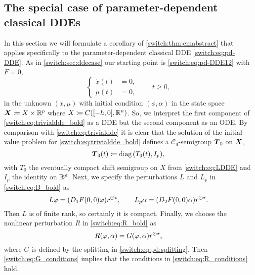\subsection{The special case of parameter-dependent classical DDEs}\label{switch:sec:pd:ddes}
In this section we will formulate a corollary of \cref{switch:thm:cmabstract} that applies specifically to the parameter-dependent classical DDE \cref{switch:eq:pd-DDE}. As in \cref{switch:sec:ddecase} our starting point is \cref{switch:eq:pd-DDE12} with $F = 0$,
%
\begin{equation}
  \label{switch:eq:trivialdde_bold}
  \left\{
    \begin{aligned}
      \dot{x}(t) &= 0,\\
      \dot{\mu}(t) &= 0,
    \end{aligned}
  \right.
  \qquad t \ge 0,
\end{equation}
%
in the unknown $(x, \mu)$ with initial condition $(\phi,\alpha)$ in the state space $\boldsymbol{X} \coloneqq X \times \mathbb{R}^p$ where $X \coloneqq C([-h,0],\mathbb{R}^n)$. So, we interpret the first component of \cref{switch:eq:trivialdde_bold} as a DDE but the second component as an ODE. By comparison with \cref{switch:eq:trivialdde} it is clear that the solution of the initial value problem for \cref{switch:eq:trivialdde_bold} defines a $\mathcal{C}_0$-semigroup $\boldsymbol{T}_0$ on $\boldsymbol{X}$,
\[
 \boldsymbol{T}_0(t) \coloneqq \operatorname{diag}{(T_0(t), I_p)},
\]
with $T_0$ the eventually compact shift semigroup on $X$ from \cref{switch:eq:LDDE} and $I_p$ the identity on $\mathbb{R}^p$. Next, we specify the perturbations $L$ and $L_p$ in \cref{switch:eq:B_bold} as
\[
  L\varphi = (D_1F(0,0)\varphi)r^{\odot\star}, \qquad L_p\alpha = (D_2F(0,0)\alpha)r^{\odot\star}.
\]
Then $L$ is of finite rank, so certainly it is compact. Finally, we choose the nonlinear perturbation $R$ in \cref{switch:eq:R_bold} as
\begin{equation}
  \label{switch:eq:pd:Rdde}
  R(\varphi,\alpha) = G(\varphi,\alpha)r^{\odot\star},
\end{equation}
where $G$ is defined by the splitting in \cref{switch:eq:pd:splitting}. Then \cref{switch:eq:G_conditions} implies that the conditions in \cref{switch:eq:R_conditions} hold.

